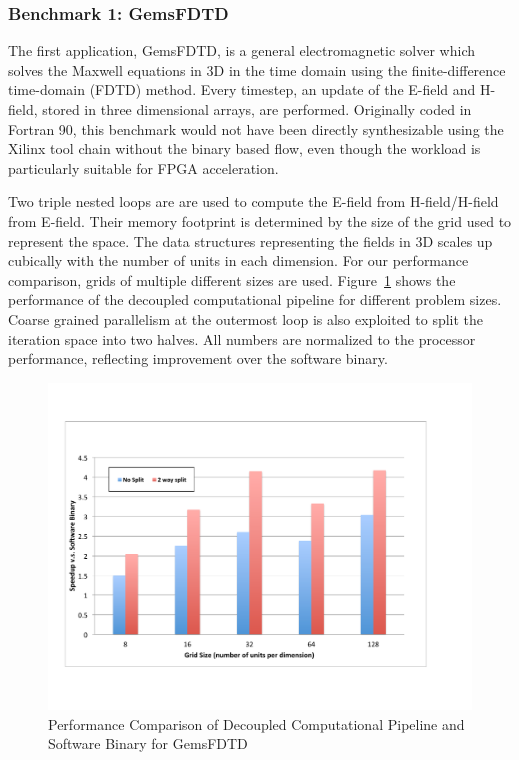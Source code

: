 \subsubsection{Benchmark 1: GemsFDTD}
The first application, GemsFDTD, is
a general electromagnetic solver which solves the Maxwell equations in 3D in the time domain using the finite-difference time-domain (FDTD) method. Every timestep,
an update of the E-field and H-field, stored in three dimensional arrays, are performed. Originally coded in Fortran 90, this benchmark would not have been directly synthesizable using the Xilinx tool chain without the binary based flow, even though the workload is particularly suitable for FPGA acceleration. 


Two triple nested loops are  are used to compute  the E-field from H-field/H-field from E-field.
Their memory footprint is determined by the size of the grid used to represent the space. The data structures representing the fields in 3D scales up cubically with the number of units in each dimension. For our performance comparison, grids of multiple different sizes are used. 
Figure~\ref{fig:fdtdPerf} shows the performance of the decoupled computational pipeline for different problem sizes. Coarse grained parallelism at the outermost loop is also exploited to split the iteration space into two halves. 
All numbers are normalized to the processor performance, reflecting improvement over the software binary.

\begin{figure}[htp]
\begin{center}
\includegraphics[width=1.0\linewidth]{chap6fig/fdtdPerformance.pdf}
\caption{Performance Comparison of Decoupled Computational Pipeline and Software Binary for GemsFDTD
\label{fig:fdtdPerf}}
\end{center}
\end{figure}

